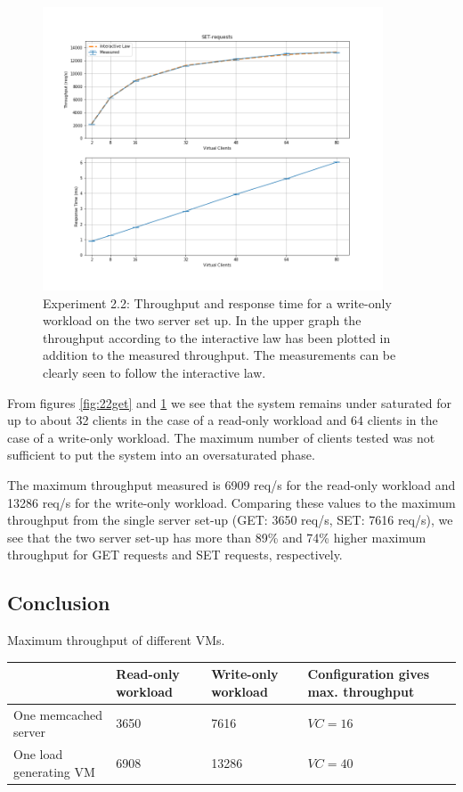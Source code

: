 \documentclass[11pt,a4paper]{article}
\begin{document}
\begin{figure}[h]
\centering
\includegraphics[width=0.9\textwidth]{22/22_set_requests}
\caption{Experiment 2.2: Throughput and response time for a write-only workload on the two server set up. In the upper graph the throughput according to the interactive law has been plotted in addition to the measured throughput. The measurements can be clearly seen to follow the interactive law.}
\label{fig:22set}
\end{figure}

From figures \ref{fig:22get} and \ref{fig:22set} we see that the system remains under saturated for up to about 32 clients in the case of a read-only workload and 64 clients in the case of a write-only workload. The maximum number of clients tested was not sufficient to put the system into an oversaturated phase.

The maximum throughput measured is 6909 req/s for the read-only workload and 13286 req/s for the write-only workload. Comparing these values to the maximum throughput from the single server set-up (GET: 3650 req/s, SET: 7616 req/s), we see that the two server set-up has more than 89\% and 74\% higher maximum throughput for GET requests and SET requests, respectively.
\newpage


\subsection{Conclusion}

\begin{center}
	{Maximum throughput of different VMs.}
	\begin{tabular}{|l|p{2cm}|p{2cm}|p{4cm}|}
		\hline                        & Read-only workload & Write-only workload & Configuration gives max. throughput \\ 
		\hline One memcached server   &          3650      &       7616         &    $VC = 16$                           \\ 
		\hline One load generating VM &          6908      &       13286       &    $VC = 40$                           \\ 
		\hline 
	\end{tabular}
\end{center}
\end{document}
